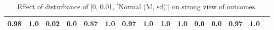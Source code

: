 \begin{table}
\begin{tabular}{l|cc|cc|cc|cc|cc|cc|cc}
\cellcolor{Bittersweet}0.98&\cellcolor{Bittersweet}1.0&\cellcolor{Bittersweet}0.02&\cellcolor{Bittersweet}0.0&0.57&1.0&\cellcolor{Bittersweet}0.97&\cellcolor{Bittersweet}1.0&\cellcolor{Bittersweet}1.0&\cellcolor{Bittersweet}1.0&\cellcolor{Bittersweet}0.0&\cellcolor{Bittersweet}0.0&\cellcolor{Bittersweet}0.97&\cellcolor{Bittersweet}1.0\\\bottomrule\end{tabular}\caption{Effect of disturbance of [0, 0.01, 'Normal (M, sd)'] on strong view of outcomes.}\end{table}